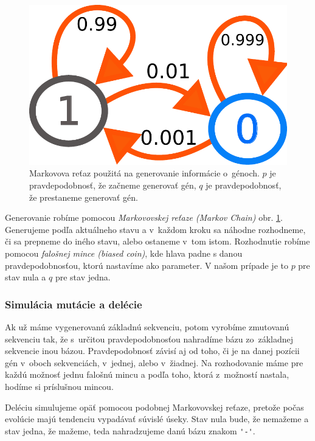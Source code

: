 \begin{figure}[htp]
    \centering
    \includegraphics[width=.7\textwidth]{images/markov_chain}
    \caption[Markovova reťaz použitá na generovanie informácie o~génoch]{Markovova reťaz použitá na generovanie informácie o~génoch. $p$ je pravdepodobnosť, že začneme generovať gén, $q$ je pravdepodobnosť, že prestaneme generovať gén.}
    \label{fig:markov-chain}
\end{figure}

Generovanie robíme pomocou \textit{Markovovskej reťaze (Markov Chain)} obr. \ref{fig:markov-chain}. Generujeme podľa aktuálneho stavu a v~každom kroku sa náhodne rozhodneme, či sa prepneme do iného stavu, alebo ostaneme v~tom istom. Rozhodnutie robíme pomocou \textit{falošnej mince (biased coin)}, kde hlava padne s danou pravdepodobnosťou, ktorú nastavíme ako parameter. V našom prípade je to $p$ pre stav nula a $q$ pre stav jedna.


\subsubsection{Simulácia mutácie a delécie}

Ak už máme vygenerovanú základnú sekvenciu, potom vyrobíme zmutovanú sekvenciu tak, že s~určitou pravdepodobnosťou nahradíme bázu zo~základnej sekvencie inou bázou. Pravdepodobnosť závisí aj od toho, či je na danej pozícii gén v~oboch sekvenciách, v~jednej, alebo v~žiadnej. Na rozhodovanie máme pre každú možnosť jednu falošnú mincu a podľa toho, ktorá z~možností nastala, hodíme si príslušnou mincou.

Deléciu simulujeme opäť pomocou podobnej Markovovskej reťaze, pretože počas evolúcie majú tendenciu vypadávať súvislé úseky. Stav nula bude, že nemažeme a stav jedna, že mažeme, teda nahradzujeme danú bázu znakom {\verb+'-'+}.

